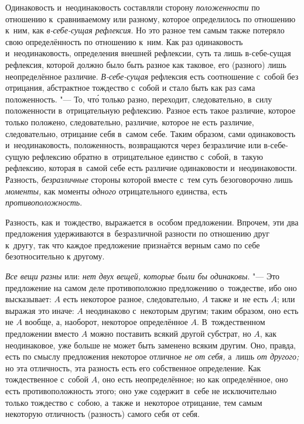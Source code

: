 Одинаковость и~неодинаковость составляли сторону
{\em положенности} по отношению к~сравниваемому или
разному, которое определилось по отношению к~ним, как
{\em в-себе-сущая рефлексия}. Но это разное тем самым
также потеряло свою определённость по отношению к~ним. Как раз одинаковость
и~неодинаковость, определения внешней рефлексии, суть та лишь в-себе-сущая
рефлексия, которой должно было быть разное как таковое, его (разного) лишь
неопределённое различие. {\em В-себе-сущая} рефлексия
есть соотношение с~собой без отрицания, абстрактное тождество с~собой и
стало быть как раз сама положенность. "--- То, чт\'{о} только разно, переходит,
следовательно, в~силу положенности в~отрицательную рефлексию. Разное есть
такое различие, которое только положено, следовательно, различие, которое
не есть различие, следовательно, отрицание себя в~самом себе. Таким
образом, сами одинаковость и~неодинаковость, положенность, возвращаются
через безразличие или в-себе-сущую рефлексию обратно в~отрицательное
единство с~собой, в~такую рефлексию, которая в~самой себе есть различие
одинаковости и~неодинаковости. Разность,
{\em безразличные} стороны которой вместе с~тем суть
безоговорочно лишь {\em моменты,} как моменты
{\em одного} отрицательного единства, есть {\em противоположность}.


Разность, как и~тождество, выражается в~особом предложении. Впрочем, эти два
предложения удерживаются в~безразличной разности по отношению друг к~другу,
так что каждое предложение признаётся верным само по себе безотносительно к
другому.

{\em Все вещи разны} или: {\em нет
двух вещей, которые были бы одинаковы}. "--- Это предложение на самом деле
противоположно предложению о~тождестве, ибо оно высказывает: $A$
есть некоторое разное, следовательно, $A$ также и~не есть
$A$; или выражая это иначе: $A$ неодинаково с~некоторым
другим; таким образом, оно есть не $A$ вообще, а, наоборот,
некоторое определённое $A$. В~тождественном предложении вместо
$A$ можно поставить всякий другой субстрат, но $A$, как
неодинаковое, уже больше не может быть заменено всяким другим. Оно, правда,
есть по смыслу предложения некоторое отличное {\em не от себя,}
а~лишь {\em от другого;} но эта отличность,
эта разность есть его собственное определение. Как тождественное с~собой
$A$, оно есть неопределённое; но как определённое, оно есть
противоположность этого; оно уже содержит в~себе не исключительно только
тождество с~собою, а~также и~некоторое отрицание, тем самым некоторую
отличность (разность) самого себя от себя.

